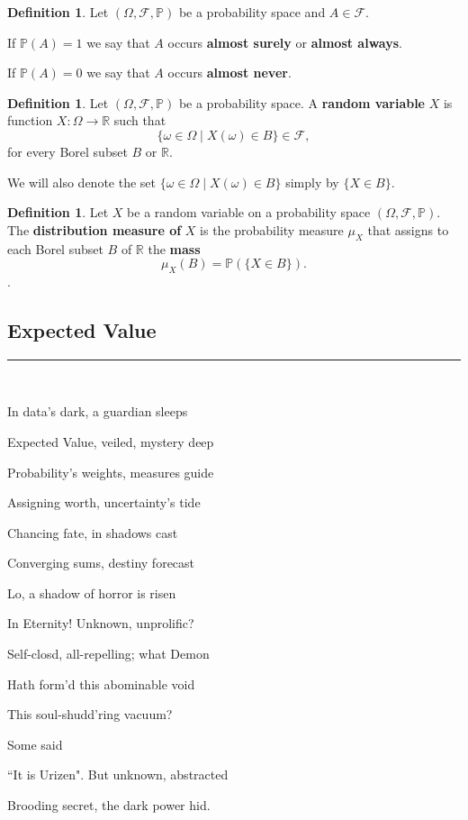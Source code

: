 \documentclass[reqno,a4paper,12pt]{amsart}%
\numberwithin{equation}{section}
\theoremstyle{definition}
\newtheorem{definition}[theorem]{Definition}
\newcommand{\Pp}{{\mathbb{P}}}
\newcommand{\Rr}{{\mathbb{R}}}
\begin{document}
\begin{definition}
	Let $(\Omega, \mathcal{F}, \Pp)$ be a probability space and $A \in \mathcal{F}$. 
	
	If $\Pp (A)= 1$ we say that $A$ occurs \textbf{almost surely} or \textbf{almost always}.
	
	If $\Pp (A)= 0$ we say that $A$ occurs \textbf{almost never}. 
\end{definition}



				

\begin{definition}
	Let $(\Omega, \mathcal{F}, \Pp)$ be a probability space. A \textbf{random variable} $X$ is function $X: \Omega \rightarrow \Rr $ such that 
	$$ \{\omega \in \Omega \mid X(\omega) \in B\} \in \mathcal{F},$$ for every Borel subset $B$ or $\Rr.$
	
	We will also denote the set $\{\omega \in \Omega \mid X(\omega) \in B\}$ simply by $\{X \in B\}.$
\end{definition}

\begin{definition}
 Let $X$ be a random variable on a probability space  $(\Omega, \mathcal{F}, \Pp)$. The
\textbf{distribution measure of} $X$ is the probability measure $\mu_X$ that assigns to each Borel
subset $B$ of $\Rr$ the \textbf{mass} $$\mu_X(B) = \Pp (\{X \in B\}).$$.
\end{definition}

\subsection{Expected Value}

\begin{center}
	\par\noindent\rule{200pt}{0.1pt}
\end{center}

\


\begin{center}

In data's dark, a guardian sleeps

Expected Value, veiled, mystery deep

Probability's weights, measures guide

Assigning worth, uncertainty's tide

Chancing fate, in shadows cast

Converging sums, destiny forecast

Lo, a shadow of horror is risen 

In Eternity! Unknown, unprolific? 

Self-closd, all-repelling; what Demon 

Hath form'd this abominable void 

This soul-shudd'ring vacuum? 

Some said 

``It is Urizen". But unknown, abstracted 

Brooding secret, the dark power hid.	
\end{center}
\end{document}
